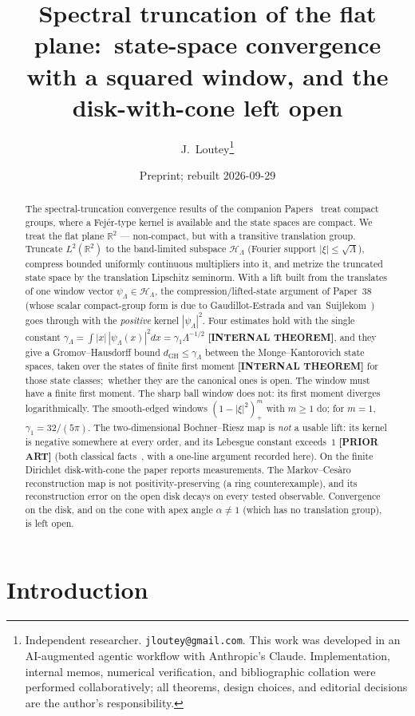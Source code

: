\documentclass[11pt,a4paper]{article}
\title{Spectral truncation of the flat plane:\ state-space convergence
with a squared window, and the disk-with-cone left open}
\author{J.~Loutey\thanks{Independent researcher. \texttt{jloutey@gmail.com}.
This work was developed in an AI-augmented agentic workflow with
Anthropic's Claude. Implementation, internal memos, numerical
verification, and bibliographic collation were performed
collaboratively; all theorems, design choices, and editorial decisions
are the author's responsibility.}}
\date{Preprint; rebuilt 2026-09-29}
\theoremstyle{plain}
\theoremstyle{definition}
\newcommand{\Hilb}{\mathcal{H}}
\newcommand{\R}{\mathbb{R}}
\begin{document}
\maketitle

\begin{abstract}
The spectral-truncation convergence results of the companion
Papers~\cite{paper38,paper40} treat compact groups, where a Fej\'er-type
kernel is available and the state spaces are compact. We treat the flat
plane $\R^{2}$ --- non-compact, but with a transitive translation group.
Truncate $L^{2}(\R^{2})$ to the band-limited subspace $\Hilb_{\Lambda}$
(Fourier support $|\xi|\le\sqrt\Lambda$), compress bounded uniformly
continuous multipliers into it, and metrize the truncated state space by
the translation Lipschitz seminorm. With a lift built from the
translates of one window vector $\psi_{\Lambda}\in\Hilb_{\Lambda}$, the
compression/lifted-state argument of Paper~38 (whose scalar
compact-group form is due to Gaudillot-Estrada and
van~Suijlekom~\cite{gaudillot_vs2025}) goes through with the
\emph{positive} kernel $|\psi_{\Lambda}|^{2}$. Four estimates hold with the
single constant $\gamma_{\Lambda}=\int|x|\,|\psi_{\Lambda}(x)|^{2}dx=
\gamma_{1}\Lambda^{-1/2}$ \textbf{[INTERNAL THEOREM]}, and they give a
Gromov--Hausdorff bound $d_{\mathrm{GH}}\le\gamma_{\Lambda}$ between the
Monge--Kantorovich state spaces, taken over the states of finite first
moment \textbf{[INTERNAL THEOREM]} for those state classes;\ whether they
are the canonical ones is open. The window must have a finite first moment.
The sharp ball window does not: its first moment diverges
logarithmically. The smooth-edged windows $(1-|\xi|^{2})_{+}^{m}$ with
$m\ge1$ do; for $m=1$, $\gamma_{1}=32/(5\pi)$. The two-dimensional
Bochner--Riesz map is \emph{not} a usable lift: its kernel is negative
somewhere at every order, and its Lebesgue constant exceeds~$1$
\textbf{[PRIOR ART]} (both classical facts~\cite{stein_weiss}, with a one-line argument recorded here). On the finite Dirichlet disk-with-cone the paper
reports measurements. The Markov--Ces\`aro
reconstruction map is not positivity-preserving (a ring counterexample),
and its reconstruction error on the open disk decays on every tested
observable.
Convergence on the disk, and on the cone with apex angle $\alpha\ne1$
(which has no translation group), is left open.
\end{abstract}

\section{Introduction}
\label{sec:intro}
\end{document}
